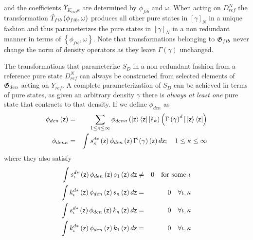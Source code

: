 and the coefficients $\Upsilon _{K_{OD}\kappa }$ are determined by $\phi
_{fib}$ and $\omega $. When acting on $D_{ref}^{N}$ the transformation $\hat{%
T}_{fib}\left( \phi _{fib},\omega \right) $ produces all other pure states
in $\left[ \gamma \right] _{N}$ in a unique fashion and thus parameterizes
the pure states in $\left[ \gamma \right] _{N}$ in a non redundant manner in
terms of $\left\{ \phi _{fib},\omega \right\} $. Note that transformations
belonging to ${\frak G}_{fib}$ never change the norm of density operators as
they leave $\Gamma \left( \gamma \right) $ unchanged.

The transformations that parameterize $S_{D}$ in a non redundant fashion
from a reference pure state $D_{ref}^{N}$ can always be constructed from
selected elements of ${\frak G}_{den}$ acting on $Y_{ref}$. A complete
parameterization of $S_{D}$ can be achieved in terms of pure states, as
given an arbitrary density $\gamma $ there is {\em always at least one} pure
state that contracts to that density. If we define $\phi _{den}$ as 
\begin{eqnarray}
\phi _{den}\left( {\sf z}\right) &=&\sum_{1\leq \kappa \leq \infty }\phi
_{den\kappa }\left( \left| {\sf z}\right\rangle \left\langle {\sf z}\right| |%
\breve{s}_{\kappa }\right) \left( \Gamma \left( \gamma \right) ^{d}|\left| 
{\sf z}\right\rangle \left\langle {\sf z}\right| \right)  \nonumber \\
\phi _{den\kappa } &=&\int s_{\kappa }^{d\ast }\left( {\sf z}\right) \phi
_{den}\left( {\sf z}\right) \Gamma \left( \gamma \right) \left( {\sf z}%
\right) d{\sf z};\quad 1\leq \kappa \leq \infty
\end{eqnarray}%
where they also satisfy 
\begin{eqnarray}
\int s_{\iota }^{d\ast }\left( {\sf z}\right) \phi _{den}\left( {\sf z}%
\right) s_{1}\left( {\sf z}\right) d{\sf z} &\neq &0\quad \text{for some }%
\iota  \nonumber \\
\int k_{\iota }^{d\ast }\left( {\sf z}\right) \phi _{den}\left( {\sf z}%
\right) s_{\kappa }\left( {\sf z}\right) d{\sf z} &=&0\quad \forall \iota
,\kappa  \nonumber \\
\int s_{\iota }^{d\ast }\left( {\sf z}\right) \phi _{den}\left( {\sf z}%
\right) k_{\kappa }\left( {\sf z}\right) d{\sf z} &=&0\quad \forall \iota
,\kappa  \nonumber \\
\int k_{\iota }^{d\ast }\left( {\sf z}\right) \phi _{den}\left( {\sf z}%
\right) k_{1}\left( {\sf z}\right) d{\sf z} &=&0\quad \forall \iota ,\kappa
\end{eqnarray}%
